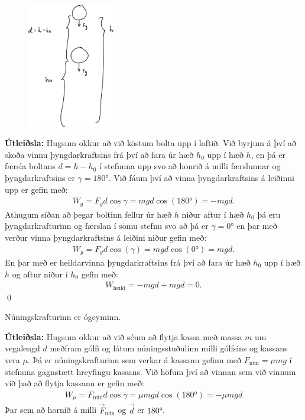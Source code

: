 \begin{minipage}{\linewidth}
\begin{figure}
\vspace{-0.5cm}
\includegraphics[width=1.5in]{temp/gravwork.pdf}
\end{figure}

\textbf{Útleiðsla:} Hugsum okkur að við köstum bolta upp í loftið. Við byrjum á því að skoða vinnu þyngdarkraftsins frá því að fara úr hæð $h_0$ upp í hæð $h$, en þá er færsla boltans $d = h-h_0$ í stefnuna upp svo að honrið á milli færslunnar og þyngdarkraftsins er $\gamma = \ang{180}$. Við fáum því að vinna þyngdarkraftsins á leiðinni upp er gefin með:
\begin{align*}
    W_g = F_g d \cos\gamma = mgd \cos(\ang{180}) = -mgd.
\end{align*}
Athugum síðan að þegar boltinn fellur úr hæð $h$ niður aftur í hæð $h_0$ þá eru þyngdarkrafturinn og færslan í sömu stefnu svo að þá er $\gamma = \ang{0}$ en þar með verður vinna þyngdarkraftsins á leiðini niður gefin með:
\begin{align*}
    W_g = F_g d \cos(\gamma) = mgd \cos(\ang{0}) = mgd.
\end{align*}
En þar með er heildarvinna þyngdarkraftsins frá því að fara úr hæð $h_0$ upp í hæð $h$ og aftur niður í $h_0$ gefin með:
\begin{align*}
    W_{\text{heild}} = -mgd + mgd = 0.
\end{align*}
\qed
\end{minipage}

\begin{tcolorbox}
\begin{theorem}
Núningskrafturinn er ógeyminn.
\end{theorem}
\end{tcolorbox}


\textbf{Útleiðsla:} Hugsum okkur að við séum að flytja kassa með massa $m$ um vegalengd $d$ meðfram gólfi og látum núningsstuðulinn milli gólfsins og kassans vera $\mu$. Þá er núningskrafturinn sem verkar á kassann gefinn með $F_{\text{nún}} = \mu mg$ í stefnuna gagnstætt hreyfingu kassans. Við höfum því að vinnan sem við vinnum við það að flytja kassann er gefin með:
\begin{align*}
    W_\mu = F_{\text{nún}} d \cos\gamma = \mu mg d \cos(\ang{180}) = -\mu mg d
\end{align*}
Þar sem að hornið á milli $\vec{F}_{\text{nún}}$ og $\vec{d}$ er $\ang{180}$.

